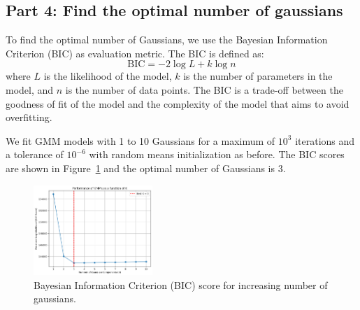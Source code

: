 \documentclass[a4paper]{article}
\begin{document}
\subsection*{Part 4: Find the optimal number of gaussians}

To find the optimal number of Gaussians, we use the Bayesian Information Criterion (BIC) as evaluation metric. The BIC is defined as:
\begin{equation}
  \text{BIC} = -2\log L + k\log n
\end{equation}
where $L$ is the likelihood of the model, $k$ is the number of parameters in the model, and $n$ is the number of data points.
The BIC is a trade-off between the goodness of fit of the model and the complexity of the model that aims to avoid overfitting.

We fit GMM models with 1 to 10 Gaussians for a maximum of $10^3$ iterations and a tolerance of $10^{-6}$ with random means initialization as before.
The BIC scores are shown in Figure~\ref{fig:gmm-eval} and the optimal number of Gaussians is 3.

\begin{figure}[htbp]
  \centering
  \includegraphics[width=0.4\textwidth]{images/gmms-eval.png}\caption{
    Bayesian Information Criterion (BIC) score for increasing number of gaussians.
  }\label{fig:gmm-eval}
\end{figure}
\end{document}
